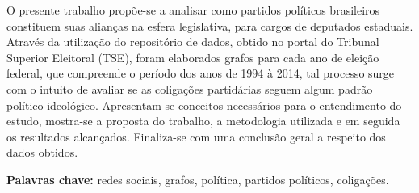 O presente trabalho  propõe-se a analisar como partidos políticos brasileiros constituem suas alianças na esfera legislativa, para cargos de deputados estaduais. Através da utilização do repositório de dados, obtido no portal do Tribunal Superior Eleitoral (TSE), foram elaborados grafos para cada ano de eleição federal, que compreende o período dos anos de 1994 à 2014, tal processo surge com o intuito de avaliar se as coligações partidárias seguem algum padrão político-ideológico. Apresentam-se conceitos necessários para o entendimento do estudo, mostra-se a proposta do trabalho, a metodologia utilizada e em seguida os resultados alcançados. Finaliza-se com uma conclusão geral a respeito dos dados obtidos.



\textbf{Palavras chave:} redes sociais, grafos, política, partidos políticos, coligações.
